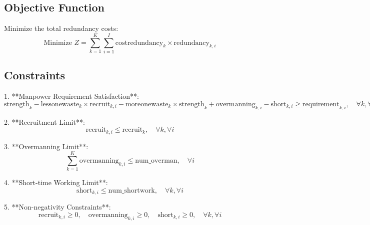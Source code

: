 \documentclass{article}
\begin{document}
\subsection*{Objective Function}
Minimize the total redundancy costs:
\[
\text{Minimize } Z = \sum_{k=1}^{K} \sum_{i=1}^{I} \text{costredundancy}_{k} \times \text{redundancy}_{k,i}
\]

\subsection*{Constraints}
1. **Manpower Requirement Satisfaction**:
   \[
   \text{strength}_{k} - \text{lessonewaste}_{k} \times \text{recruit}_{k,i} - \text{moreonewaste}_{k} \times \text{strength}_{k} + \text{overmanning}_{k,i} - \text{short}_{k,i} \geq \text{requirement}_{k,i}, \quad \forall k, \forall i
   \]

2. **Recruitment Limit**:
   \[
   \text{recruit}_{k,i} \leq \text{recruit}_{k}, \quad \forall k, \forall i
   \]

3. **Overmanning Limit**:
   \[
   \sum_{k=1}^{K} \text{overmanning}_{k,i} \leq \text{num\_overman}, \quad \forall i
   \]

4. **Short-time Working Limit**:
   \[
   \text{short}_{k,i} \leq \text{num\_shortwork}, \quad \forall k, \forall i
   \]

5. **Non-negativity Constraints**:
   \[
   \text{recruit}_{k,i} \geq 0, \quad \text{overmanning}_{k,i} \geq 0, \quad \text{short}_{k,i} \geq 0, \quad \forall k, \forall i
   \]
\end{document}
